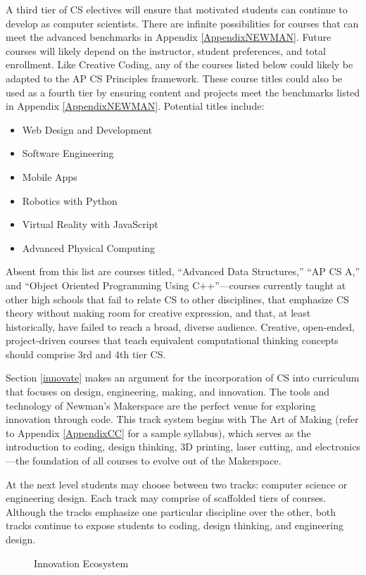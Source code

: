 A third tier of CS electives will ensure that motivated students can continue to develop as computer scientists. There are infinite possibilities for courses that can meet the advanced benchmarks in Appendix \ref{AppendixNEWMAN}. Future courses will likely depend on the instructor, student preferences, and total enrollment. Like Creative Coding, any of the courses listed below could likely be adapted to the AP CS Principles framework. These course titles could also be used as a fourth tier by ensuring content and projects meet the benchmarks listed in Appendix \ref{AppendixNEWMAN}. Potential titles include:
\begin{itemize}
	\item Web Design and Development
	\item Software Engineering
	\item Mobile Apps
	\item Robotics with Python
	\item Virtual Reality with JavaScript
	\item Advanced Physical Computing
\end{itemize}
Absent from this list are courses titled, ``Advanced Data Structures,'' ``AP CS A,'' and ``Object Oriented Programming Using C++''---courses currently taught at other high schools that fail to relate CS to other disciplines, that emphasize CS theory without making room for creative expression, and that, at least historically, have failed to reach a broad, diverse audience. Creative, open-ended, project-driven courses that teach equivalent computational thinking concepts should comprise 3rd and 4th tier CS. \par

Section \ref{innovate} makes an argument for the incorporation of CS into curriculum that focuses on design, engineering, making, and innovation. The tools and technology of Newman's Makerspace are the perfect venue for exploring innovation through code. This track system begins with The Art of Making (refer to Appendix \ref{AppendixCC} for a sample syllabus), which serves as the introduction to coding, design thinking, 3D printing, laser cutting, and electronics---the foundation of all courses to evolve out of the Makerspace. \par
At the next level students may choose between two tracks: computer science or engineering design. Each track may comprise of scaffolded tiers of courses. Although the tracks emphasize one particular discipline over the other, both tracks continue to expose students to coding, design thinking, and engineering design.\par
\par
\begin{figure}[!ht]
  \caption{Innovation Ecosystem}
\end{figure}

